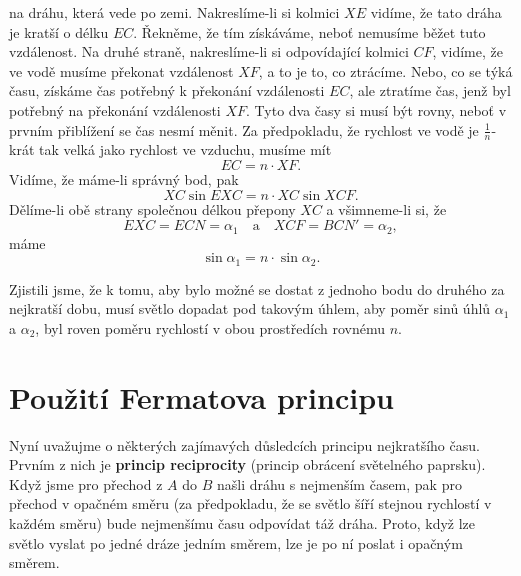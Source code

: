     na dráhu, která vede po zemi. Nakreslíme-li si kolmici \(XE\) vidíme, že tato dráha je kratší o 
    délku \(EC\). Řekněme, že tím získáváme, neboť nemusíme běžet tuto vzdálenost. Na druhé straně, 
    nakreslíme-li si odpovídající kolmici \(CF\), vidíme, že ve vodě musíme překonat vzdálenost 
    \(XF\), a to je to, co ztrácíme. Nebo, co se týká času, získáme čas potřebný k překonání 
    vzdálenosti \(EC\), ale ztratíme čas, jenž byl potřebný na překonání vzdálenosti \(XF\). Tyto 
    dva časy si musí být rovny, neboť v prvním přiblížení se čas nesmí měnit. Za předpokladu, že 
    rychlost ve vodě je \(\frac{1}{n}\)-krát tak velká jako rychlost ve vzduchu, musíme mít
    \begin{equation}\label{fyz:eq355}
      EC = n\cdot XF.
    \end{equation}
    Vidíme, že máme-li správný bod, pak
    \begin{equation*}
      XC\sin EXC = n\cdot XC\sin XCF.
    \end{equation*}
    Dělíme-li obě strany společnou délkou přepony \(XC\) a všimneme-li si, že
    \begin{equation*}
      EXC = ECN = \alpha_1 \quad \text{a} \quad XCF = BCN' = \alpha_2,
    \end{equation*}
    máme
    \begin{equation}\label{fyz:eq356}
      \sin\alpha_1 = n\cdot\sin\alpha_2.
    \end{equation}
    
    Zjistili jsme, že k tomu, aby bylo možné se dostat z jednoho bodu do druhého za nejkratší dobu, 
    musí světlo dopadat pod takovým úhlem, aby poměr sinů úhlů \(\alpha_1\) a \(\alpha_2\), byl 
    roven poměru rychlostí v obou prostředích rovnému \(n\).

  \section{Použití Fermatova principu}\label{fyz:IchapXXVIsecIV}
    Nyní uvažujme o některých zajímavých důsledcích principu nejkratšího času. Prvním z nich je 
    \textbf{princip reciprocity} (princip obrácení světelného paprsku). Když jsme pro přechod z 
    \(A\) do \(B\) našli dráhu s nejmenším časem, pak pro přechod v opačném směru (za předpokladu, 
    že se světlo šíří stejnou rychlostí v každém směru) bude nejmenšímu času odpovídat táž dráha. 
    Proto, když lze světlo vyslat po jedné dráze jedním směrem, lze je po ní poslat i opačným 
    směrem.
    

